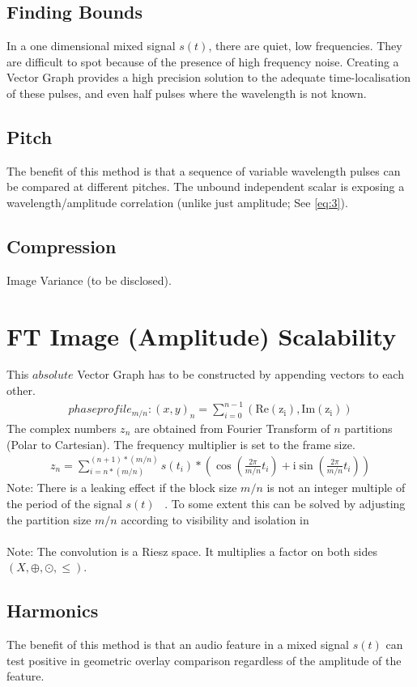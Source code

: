 \documentclass{report}
\begin{document}
\subsection{Finding Bounds}
In a one dimensional mixed signal $s(t)$, there are quiet, low frequencies. They are difficult to spot because of the presence of high frequency noise. Creating a Vector Graph provides a high precision solution to the adequate time-localisation of these pulses, and even half pulses where the wavelength is not known.
\subsection{Pitch}
The benefit of this method is that a sequence of variable wavelength pulses can be compared at different pitches. The unbound independent scalar is exposing a wavelength/amplitude correlation (unlike just amplitude; See \eqref{eq:3}).
\subsection{Compression}
Image Variance (to be disclosed).
\section{FT Image (Amplitude) Scalability}
This $absolute$ Vector Graph has to be constructed by appending vectors to each other.
\begin{align}
phaseprofile_{m/n}: (x,y)_{n}=\sum \limits _{i=0}^{n-1}(\mathrm{Re(z_{i})},\mathrm{Im(z_{i})})
\end{align}
The complex numbers $z_{n}$ are obtained from Fourier Transform of $n$ partitions (Polar to Cartesian). The frequency multiplier is set to the frame size.
\begin{align}
z_{n}= \sum \limits _{i=n*(m/n)}^{(n+1)*(m/n)} s(t_{i})*(\cos(\frac{2\pi}{m/n}t_{i})+\mathrm{i}\sin(\frac{2\pi}{m/n}t_{i}))\label{eq:3}
\end{align}
Note: There is a leaking effect if the block size $m/n$ is not an integer multiple of the period of the signal $s(t)$ ~\cite[Fensterfunktion]{Fensterfunktion}. To some extent this can be solved by adjusting the partition size $m/n$ according to visibility and isolation in ~\cite[Stopeight\_Comparator.tex]{Comparator}\\\\
Note: The convolution is a Riesz space. It multiplies a factor on both sides $(X,\oplus,\odot,\leq)$.
\subsection{Harmonics}
The benefit of this method is that an audio feature in a mixed signal $s(t)$ can test positive in geometric overlay comparison regardless of the amplitude of the feature.

\iffalse
\printbibliography
\fi
{}

\end{document}

